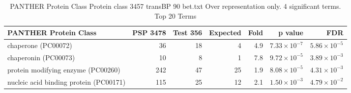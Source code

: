 \begin{table}[ht]
\centering
\begin{adjustbox}{width=\textwidth}
\begin{tabular}{lrrrrrr}
  \hline
PANTHER Protein Class & PSP 3478 & Test 356 & Expected & Fold & p value & FDR \\ 
  \hline
chaperone (PC00072) & 36 & 18 & 4 & 4.9 & $7.33 \times 10^{-7}$ & $5.86 \times 10^{-5}$ \\ 
  chaperonin (PC00073) & 10 & 8 & 1 & 7.8 & $9.72 \times 10^{-5}$ & $3.89 \times 10^{-3}$ \\ 
  protein modifying enzyme (PC00260) & 242 & 47 & 25 & 1.9 & $8.08 \times 10^{-5}$ & $4.31 \times 10^{-3}$ \\ 
  nucleic acid binding protein (PC00171) & 115 & 25 & 12 & 2.1 & $1.50 \times 10^{-3}$ & $4.79 \times 10^{-2}$ \\ 
   \hline
\end{tabular}
\end{adjustbox}
\caption{PANTHER Protein Class Protein class 3457 transBP 90 bet.txt Over representation only. 4 significant terms. Top 20 Terms} 
\label{tab:PANTHER Protein Class Protein class 3457 transBP 90 bet.txt Over representation only. 4 significant terms. Top 20 Terms}
\end{table}



